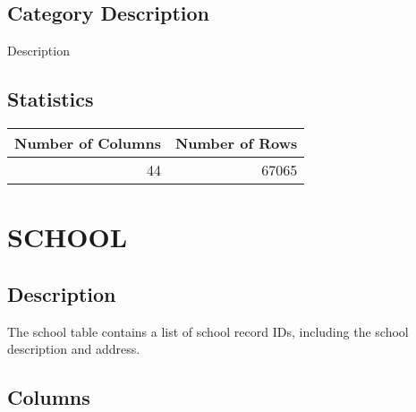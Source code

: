 \documentclass[
  letterpaper,
  DIV=11,
  numbers=noendperiod]{scrreprt}
\begin{document}
\hypertarget{category-description-33}{%
\section*{Category Description}\label{category-description-33}}

Description

\hypertarget{statistics-33}{%
\section*{Statistics}\label{statistics-33}}

\begin{longtable}{rr}
\toprule
Number of Columns & Number of Rows \\ 
\midrule
44 & 67065 \\ 
\bottomrule
\end{longtable}

\hypertarget{school}{%
\chapter*{SCHOOL}\label{school}}

\hypertarget{description-34}{%
\section*{Description}\label{description-34}}

The school table contains a list of school record IDs, including the
school description and address.

\hypertarget{columns-34}{%
\section*{Columns}\label{columns-34}}
\end{document}
